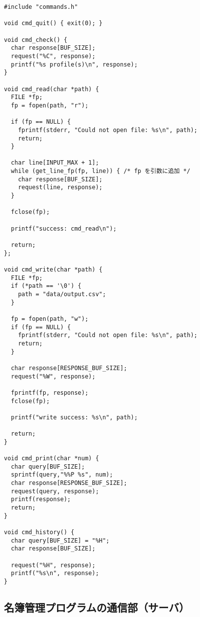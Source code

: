 \documentclass[11pt]{jsarticle}
\begin{document}
\begin{verbatim}
#include "commands.h"

void cmd_quit() { exit(0); }

void cmd_check() {
  char response[BUF_SIZE];
  request("%C", response);
  printf("%s profile(s)\n", response);
}

void cmd_read(char *path) {
  FILE *fp;
  fp = fopen(path, "r");

  if (fp == NULL) {
    fprintf(stderr, "Could not open file: %s\n", path);
    return;
  }

  char line[INPUT_MAX + 1];
  while (get_line_fp(fp, line)) { /* fp を引数に追加 */
    char response[BUF_SIZE];
    request(line, response);
  }

  fclose(fp);

  printf("success: cmd_read\n");

  return;
};

void cmd_write(char *path) {
  FILE *fp;
  if (*path == '\0') {
    path = "data/output.csv";
  }

  fp = fopen(path, "w");
  if (fp == NULL) {
    fprintf(stderr, "Could not open file: %s\n", path);
    return;
  }
    
  char response[RESPONSE_BUF_SIZE];
  request("%W", response);

  fprintf(fp, response);
  fclose(fp);

  printf("write success: %s\n", path);

  return;
}

void cmd_print(char *num) {
  char query[BUF_SIZE];
  sprintf(query,"%%P %s", num);
  char response[RESPONSE_BUF_SIZE];
  request(query, response);
  printf(response);
  return;
}

void cmd_history() {
  char query[BUF_SIZE] = "%H";
  char response[BUF_SIZE];
  
  request("%H", response);
  printf("%s\n", response);
}
\end{verbatim}

\subsection{名簿管理プログラムの通信部（サーバ）} \label{sec:server.c}
\end{document}
